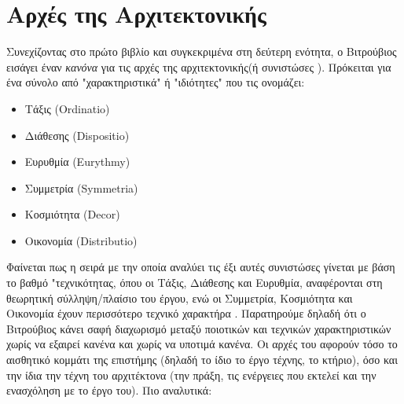 \section{Αρχές της Αρχιτεκτονικής}

Συνεχίζοντας στο πρώτο βιβλίο και συγκεκριμένα στη δεύτερη ενότητα, ο Βιτρούβιος εισάγει έναν \emph{κανόνα} για τις αρχές της αρχιτεκτονικής(ή συνιστώσες \cite{vitruvius-lefas}). Πρόκειται για ένα σύνολο από "χαρακτηριστικά" ή "ιδιότητες" που τις ονομάζει:

\begin{itemize}[noitemsep]
\item Τάξις (Ordinatio)
\item Διάθεσης (Dispositio)
\item Ευρυθμία (Eurythmy)
\item Συμμετρία (Symmetria) 
\item Κοσμιότητα (Decor) 
\item Οικονομία (Distributio)
\end{itemize}

Φαίνεται πως η σειρά με την οποία αναλύει τις έξι αυτές συνιστώσες γίνεται με 
βάση το βαθμό "τεχνικότητας, όπου οι Τάξις, Διάθεσης και Ευρυθμία, αναφέρονται 
στη θεωρητική σύλληψη/πλαίσιο του έργου, ενώ οι Συμμετρία, Κοσμιότητα και 
Οικονομία έχουν περισσότερο τεχνικό χαρακτήρα \cite{vitruvius-lefas}. 
Παρατηρούμε δηλαδή ότι ο Βιτρούβιος κάνει σαφή διαχωρισμό μεταξύ ποιοτικών και 
τεχνικών χαρακτηριστικών χωρίς να εξαιρεί κανένα και χωρίς να υποτιμά κανένα. 
Οι αρχές του αφορούν τόσο το αισθητικό κομμάτι της επιστήμης (δηλαδή το ίδιο το 
έργο τέχνης, το κτήριο), όσο και την ίδια την τέχνη του αρχιτέκτονα (την πράξη, 
τις ενέργειες που εκτελεί και την ενασχόληση με το έργο του). Πιο 
αναλυτικά\cite{vitruvius-lefas,lefas-fundamental}: 
 
